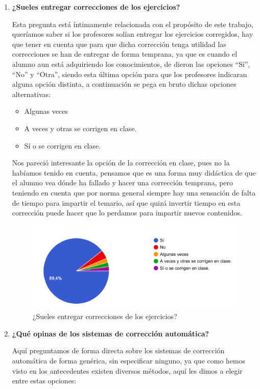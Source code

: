 \begin{enumerate}
\item \textbf{¿Sueles entregar correcciones de los ejercicios?}

Esta pregunta está íntimamente relacionada con el propósito de este trabajo, queríamos saber si los profesores solían entregar los ejercicios corregidos, hay que tener en cuenta que para que dicha corrección tenga utilidad las correcciones se han de entregar de forma temprana, ya que es cuando el alumno aun está adquiriendo los conocimientos, de dieron las opciones ``Sí'', ``No'' y ``Otra'', siendo esta última opción para que los profesores indicaran alguna opción distinta, a continuación se pega en bruto dichas opciones alternativas:

\begin{itemize}
    \item Algunas veces
    \item A veces y otras se corrigen en clase.
    \item Sí o se corrigen en clase.
\end{itemize}

Nos pareció interesante la opción de la corrección en clase, pues no la habíamos tenido en cuenta, pensamos que es una forma muy didáctica de que el alumno vea dónde ha fallado y hacer una corrección temprana, pero teniendo en cuenta que por norma general siempre hay una sensación de falta de tiempo para impartir el temario, así que quizá invertir tiempo en esta corrección puede hacer que lo perdamos para impartir nuevos contenidos.

\begin{figure}[H]
\centering
\includegraphics[width=1.0\textwidth]{../images/quiz_5}
\caption{¿Sueles entregar correcciones de los ejercicios?}
\label{fig:quiz_5}
\end{figure}

\item \textbf{¿Qué opinas de los sistemas de corrección automática?}

Aquí preguntamos de forma directa sobre los sistemas de corrección automática de forma genérica, sin especificar ninguno, ya que como hemos visto en los antecedentes existen diversos métodos, aquí les dimos a elegir entre estas opciones:


\end{enumerate}
